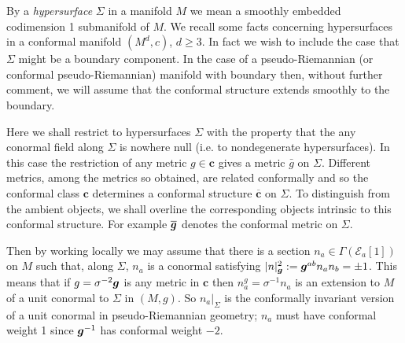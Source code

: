 \documentclass[a4paper,12pt]{amsart}
\def\Cal{\mathcal}
\newcommand{\cc}{\boldsymbol{c}}
\newcommand{\ce}{{\Cal E}}
\def\bg{\mbox{\boldmath $g$}}
\theoremstyle{remark}
\begin{document}
By a {\em hypersurface} $\Sigma$ in a manifold $M$ we mean a smoothly
embedded codimension 1 submanifold of $M$.  We recall some facts
concerning hypersurfaces in a conformal manifold
$(M^d,c)$, $d\geq 3$. In fact we wish to include the case that $\Sigma$ might be a boundary component. In the case of a pseudo-Riemannian (or conformal pseudo-Riemannian) manifold with boundary then, without further
comment, we will assume that the conformal structure extends smoothly
to the boundary.

Here we shall restrict to hypersurfaces $\Sigma$ with the property
that the any conormal field along $\Sigma$ is nowhere null (i.e. to nondegenerate hypersurfaces).  In this case the restriction of any metric $g\in \cc$ gives a metric $\bar{g}$ on $\Sigma$. Different metrics, among the metrics so obtained, are related conformally and so the conformal class $\cc$ determines a conformal structure $\overline{\cc}$ on $\Sigma$. To distinguish from the ambient objects, we shall overline the corresponding objects intrinsic to this conformal structure. For example $\overline{\bg}$ denotes the conformal metric on $\Sigma$.


Then by working locally we may assume that there is a section
$n_a\in \Gamma(\ce_a[1])$ on $M$ such that, along $\Sigma$, $n_a$ is a
conormal satisfying $|n|^2_{\sbg}:=\bg^{ab}n_a n_b=\pm 1$. This means that if $g=\sigma ^{-2}\bg$ is any metric in $\cc$ then $n^g_a=\sigma^{-1}n_a$ is an extension to $M$ of a unit conormal to $\Sigma$ in $(M,g)$. So $n_a|_\Sigma$ is the conformally invariant version of a unit conormal in pseudo-Riemannian geometry; $n_a$ must have conformal weight 1 since $\bg^{-1}$ has conformal weight $-2$. 
\end{document}

